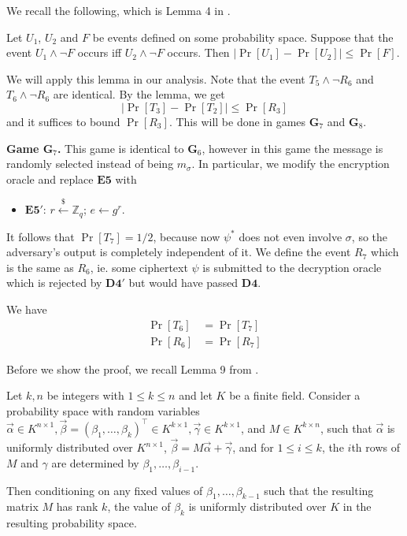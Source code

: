 \documentclass[10pt,a4paper]{article}
\newcommand{\rgets}{\xleftarrow{\$}}
\newcommand{\game}{\mathbf{G}}
\newcommand{\estep}[1]{\mathbf{E#1}}
\newcommand{\dstep}[1]{\mathbf{D#1}}
\newcommand{\Z}{\mathbb{Z}}
\begin{document}
	We recall the following, which is Lemma 4 in \cite{cs01}.
	
	\begin{lemma}
		\label{lem:neg-wedge}
		Let $U_1$, $U_2$ and $F$ be events defined on some probability space. Suppose that the event $U_1\wedge\neg F$ occurs iff $U_2\wedge\neg F$ occurs. Then $|\Pr[U_1]-\Pr[U_2]|\leq\Pr[F]$.
	\end{lemma}

	We will apply this lemma in our analysis. Note that the event $T_5\wedge\neg R_6$ and $T_6\wedge\neg R_6$ are identical. By the lemma, we get $$|\Pr[T_3]-\Pr[T_2]|\leq\Pr[R_3]$$ and it suffices to bound $\Pr[R_3]$. This will be done in games $\game_7$ and $\game_8$.
	
	\textbf{Game $\game_7$.} This game is identical to $\game_6$, however in this game the message is randomly selected instead of being $m_\sigma$. In particular, we modify the encryption oracle and replace $\estep{5}$ with
	\begin{itemize}
		\item[]$\estep{5}'$: $r\rgets\Z_q$; $e\gets g^r$.
	\end{itemize}
	It follows that $\Pr[T_7] = 1/2$, because now $\psi^{*}$ does not even involve $\sigma$, so the adversary's output is completely independent of it. We define the event $R_7$ which is the same as $R_6$, ie. some ciphertext $\psi$ is submitted to the decryption oracle which is rejected by $\dstep{4}'$ but would have passed $\dstep{4}$.
	
	\begin{lemma} We have
		\label{lem:t6t7}
		\begin{align*}
			\Pr[T_6] &= \Pr[T_7]\\
			\Pr[R_6] &= \Pr[R_7]
		\end{align*}
	\end{lemma}

	Before we show the proof, we recall Lemma 9 from \cite{cs01}.
	
	\begin{lemma}
		\label{lem:independence}
		Let $k,n$ be integers with $1\leq k\leq n$ and let $K$ be a finite field. Consider a probability space with random variables $\vec{\alpha}\in K^{n\times 1}, \vec{\beta}=(\beta_1,\dots,\beta_k)^\top\in K^{k\times 1},\vec{\gamma}\in K^{k\times 1}$, and $M\in K^{k\times n}$, such that $\vec{\alpha}$ is uniformly distributed over $K^{n\times 1}$, $\vec{\beta}=M\vec{\alpha}+\vec{\gamma}$, and for $1\leq i\leq k$, the $i$th rows of $M$ and $\gamma$ are determined by $\beta_1,\dots,\beta_{i-1}$. 
		
		Then conditioning on any fixed values of $\beta_1,\dots,\beta_{k-1}$ such that the resulting matrix $M$ has rank $k$, the value of $\beta_k$ is uniformly distributed over $K$ in the resulting probability space.
	\end{lemma}
\end{document}
